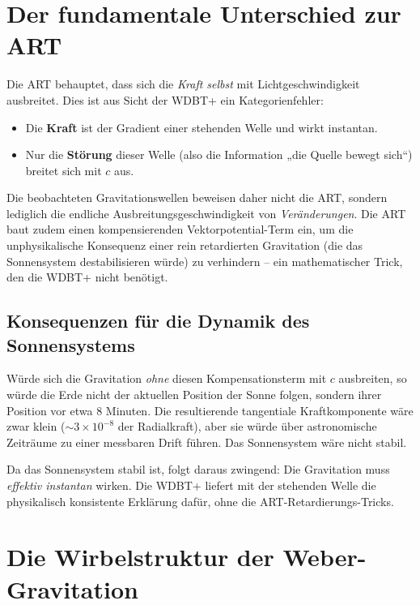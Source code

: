 \section{Der fundamentale Unterschied zur ART}
\label{sec:unterschied_art}

Die ART behauptet, dass sich die \emph{Kraft selbst} mit Lichtgeschwindigkeit ausbreitet. Dies ist aus Sicht der WDBT+ ein Kategorienfehler:

\begin{itemize}
    \item Die \textbf{Kraft} ist der Gradient einer stehenden Welle und wirkt instantan.
    \item Nur die \textbf{Störung} dieser Welle (also die Information „die Quelle bewegt sich“) breitet sich mit \(c\) aus.
\end{itemize}

Die beobachteten Gravitationswellen beweisen daher nicht die ART, sondern lediglich die endliche Ausbreitungsgeschwindigkeit von \emph{Veränderungen}. Die ART baut zudem einen kompensierenden Vektorpotential-Term ein, um die unphysikalische Konsequenz einer rein retardierten Gravitation (die das Sonnensystem destabilisieren würde) zu verhindern – ein mathematischer Trick, den die WDBT+ nicht benötigt.

\subsection{Konsequenzen für die Dynamik des Sonnensystems}
\label{sub:sonnensystem_dynamik}

Würde sich die Gravitation \emph{ohne} diesen Kompensationsterm mit \(c\) ausbreiten, so würde die Erde nicht der aktuellen Position der Sonne folgen, sondern ihrer Position vor etwa 8 Minuten. Die resultierende tangentiale Kraftkomponente wäre zwar klein (\(\sim 3 \times 10^{-8}\) der Radialkraft), aber sie würde über astronomische Zeiträume zu einer messbaren Drift führen. Das Sonnensystem wäre nicht stabil.

Da das Sonnensystem stabil ist, folgt daraus zwingend: Die Gravitation muss \emph{effektiv instantan} wirken. Die WDBT+ liefert mit der stehenden Welle die physikalisch konsistente Erklärung dafür, ohne die ART-Retardierungs-Tricks.

\section{Die Wirbelstruktur der Weber-Gravitation}
\label{sec:wirbel_wg}

